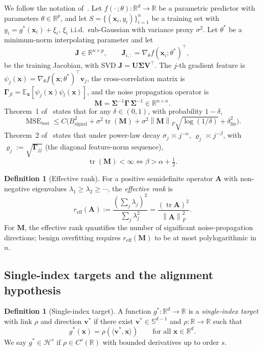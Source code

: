 \documentclass[12pt]{amsart}
\theoremstyle{definition}
\newtheorem{definition}[theorem]{Definition}
\theoremstyle{remark}
\DeclareMathOperator{\tr}{tr}
\DeclareMathOperator{\MSE}{MSE}
\newcommand{\R}{\mathbb{R}}
\newcommand{\E}{\mathbb{E}}
\newcommand{\bx}{\mathbf{x}}
\newcommand{\bJ}{\mathbf{J}}
\newcommand{\bM}{\mathbf{M}}
\newcommand{\bU}{\mathbf{U}}
\newcommand{\bV}{\mathbf{V}}
\newcommand{\bv}{\mathbf{v}}
\newcommand{\bA}{\mathbf{A}}
\newcommand{\bSigma}{\boldsymbol{\Sigma}}
\newcommand{\bGamma}{\boldsymbol{\Gamma}}
\newcommand{\norm}[1]{\left\lVert #1 \right\rVert}
\begin{document}
We follow the notation of~\cite{paperA}. Let $f(\cdot\,;\theta) \colon \R^{d} \to \R$
be a parametric predictor with parameters $\theta \in \R^{p}$, and let
$S = \{(\bx_{i}, y_{i})\}_{i=1}^{n}$ be a training set with
$y_{i} = g^{*}(\bx_{i}) + \xi_{i}$, $\xi_{i}$ i.i.d.\ sub-Gaussian with
variance proxy $\sigma^{2}$. Let $\theta^{*}$ be a minimum-norm
interpolating parameter and let
\[
  \bJ \in \R^{n \times p}, \qquad
  \bJ_{i,:} = \nabla_{\theta} f(\bx_{i};\theta^{*})^{\top},
\]
be the training Jacobian, with SVD $\bJ = \bU \bSigma \bV^{\top}$. The
$j$-th gradient feature is $\psi_{j}(\bx) = \nabla_{\theta} f(\bx;\theta^{*})^{\top}\bv_{j}$,
the cross-correlation matrix is
$\bGamma_{jl} = \E_{\bx}[\psi_{j}(\bx)\psi_{l}(\bx)]$, and the
noise propagation operator is
\[
  \bM = \bSigma^{-1} \bGamma\, \bSigma^{-1}
  \in \R^{n \times n}.
\]
Theorem~1 of~\cite{paperA} states that for any $\delta \in (0,1)$, with
probability $1-\delta$,
\begin{equation}\label{eq:gen-bound}
  \MSE_{\mathrm{test}}
  \leq C \bigl( B_{\mathrm{signal}}^{2}
       + \sigma^{2} \tr(\bM)
       + \sigma^{2} \norm{\bM}_{F} \sqrt{\log(1/\delta)}
       + \delta_{\mathrm{lin}}^{2} \bigr).
\end{equation}
Theorem~2 of~\cite{paperA} states that under power-law decay
$\sigma_{j} \asymp j^{-\alpha}$, $\varrho_{j} \asymp j^{-\beta}$, with
$\varrho_{j} := \sqrt{\bGamma_{jj}}$ (the diagonal feature-norm sequence),
\[
  \tr(\bM) < \infty \iff \beta > \alpha + \tfrac{1}{2}.
\]

\begin{definition}[Effective rank]\label{def:reff}
For a positive semidefinite operator $\bA$ with non-negative eigenvalues
$\lambda_{1} \geq \lambda_{2} \geq \cdots$, the \emph{effective rank} is
\[
  r_{\mathrm{eff}}(\bA) := \frac{(\sum_{j} \lambda_{j})^{2}}{\sum_{j} \lambda_{j}^{2}}
  = \frac{(\tr \bA)^{2}}{\norm{\bA}_{F}^{2}}.
\]
For $\bM$, the effective rank quantifies the number of significant
noise-propagation directions; benign overfitting requires $r_{\mathrm{eff}}(\bM)$
to be at most polylogarithmic in $n$.
\end{definition}

\subsection{Single-index targets and the alignment hypothesis}

\begin{definition}[Single-index target]\label{def:single-index}
A function $g^{*} \colon \R^{d} \to \R$ is a \emph{single-index target}
with link $\rho$ and direction $\bv^{*}$ if there exist
$\bv^{*} \in \mathbb{S}^{d-1}$ and $\rho \colon \R \to \R$ such that
\[
  g^{*}(\bx) = \rho(\langle \bv^{*}, \bx \rangle)
  \qquad \text{for all } \bx \in \R^{d}.
\]
We say $g^{*} \in \mathcal{H}^{s}$ if $\rho \in C^{s}(\R)$ with bounded
derivatives up to order $s$.
\end{definition}
\end{document}
